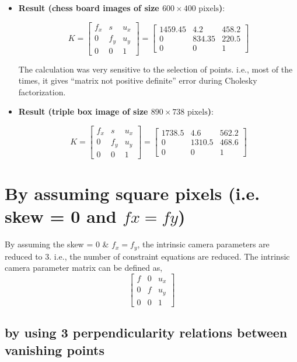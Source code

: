 \documentclass[fleqn]{article}
\begin{document}
\begin{itemize}
\item \textbf{Result (chess board images of size $600 \times 400 \text{ pixels}$)}:

\[
 K = \begin{bmatrix}
   		f_x & s & u_x \\
   		0 & f_y & u_y \\
   		0 & 0 & 1
   \end{bmatrix}
=    \begin{bmatrix}
   		1459.45 & 4.2 & 458.2 \\
   		0 & 834.35 & 220.5 \\
   		0 & 0 & 1
   \end{bmatrix}
\]

The calculation was very sensitive to the selection of points. i.e., most of the times, it gives ``matrix not positive definite'' error during Cholesky
factorization.

\item \textbf{Result (triple box image of size $890 \times 738 \text{ pixels}$)}:

\[
 K = \begin{bmatrix}
   		f_x & s & u_x \\
   		0 & f_y & u_y \\
   		0 & 0 & 1
   \end{bmatrix}
=    \begin{bmatrix}
   		1738.5 & 4.6 & 562.2 \\
   		0 & 1310.5 & 468.6 \\
   		0 & 0 & 1
   \end{bmatrix}
\]
\end{itemize}

\section{By assuming square pixels (i.e. skew = 0 and $f x = f y$)}

By assuming the skew  = 0 \& $f_x = f_y$, the intrinsic camera parameters are reduced to 3. i.e., the  number of constraint equations are reduced.
The intrinsic camera parameter matrix can be defined as,
\[
   \begin{bmatrix}
   		f & 0 & u_x \\
   		0 & f & u_y \\
   		0 & 0 & 1
   \end{bmatrix}
\]

\subsection{by using 3 perpendicularity relations between vanishing points}
\end{document}
